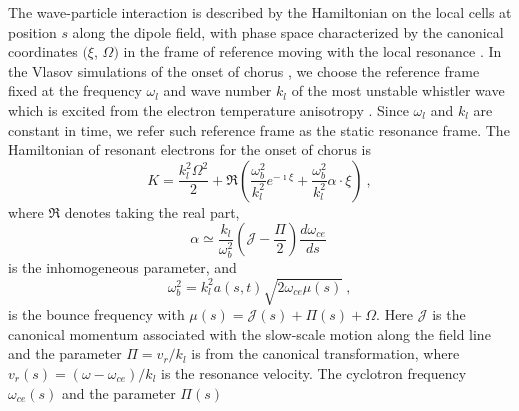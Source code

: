 The wave-particle interaction is described by the Hamiltonian on the local cells 
at position $s$ along the dipole field, with phase space characterized by the canonical coordinates $(\xi$, $\Omega)$ in the frame of reference moving with the local resonance
\cite{zheng2024}.
In the Vlasov simulations of  the onset of chorus
\cite{zheng2024,zheng2023b}, we choose the reference frame fixed at the frequency  $\omega_l$ and wave number $k_l$  of the most unstable whistler wave which is excited from the electron temperature anisotropy \cite{gary_1993}. 
Since $\omega_l$ and $k_l$ are constant in time, we refer such reference frame as the static resonance frame. 
The Hamiltonian of resonant electrons  for the onset of chorus is 
\cite{zheng2024}
\begin{equation}\label{eq.H_lab}
    K = \frac{k_l^2\Omega^2}{2} + {\Re}\left(\frac{\omega_b^2}{k_l^2} e^{-\imath \xi} + \frac{\omega_b^2}{k_l^2}\alpha \cdot \xi \right)~,
\end{equation}
where ${\Re}$ denotes taking the real part, 
\begin{equation}\label{eq.alpold}
   \alpha  \simeq \frac{k_l}{\omega_{b}^2}(\mathcal{J} - \frac{\Pi}{2}) \frac{d\omega_{ce}}{ds}~
\end{equation}
is the inhomogeneous parameter,
and 
\begin{equation}
    {\omega_b^2} = k_l^2 a(s,t) \sqrt{2\omega_{ce}\mu(s)}~,
\end{equation}
is the bounce frequency 
with $\mu(s) = \mathcal{J}(s)+\Pi(s)+\Omega$.
Here $\mathcal{J}$ is the canonical momentum associated with the slow-scale motion along the field line
and the parameter $\Pi = v_r/k_l$ is 
from the canonical transformation, 
where  $v_r(s)=(\omega - \omega_{ce})/k_l$ is the resonance velocity. The cyclotron frequency $\omega_{ce}(s)$ 
and 
the parameter $\Pi(s)$
